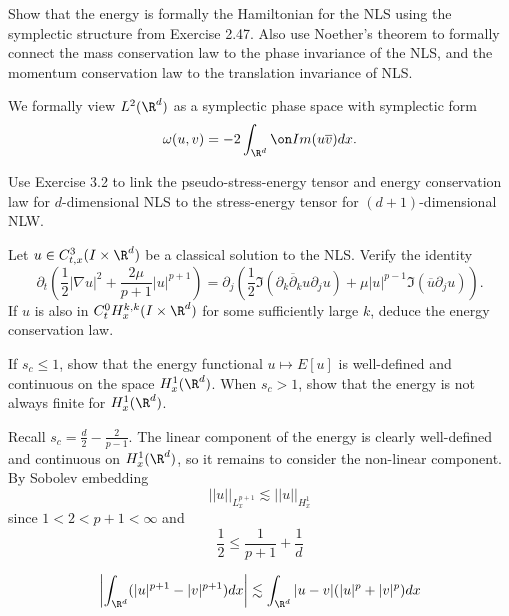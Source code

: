 \begin{statement}
	Show that the energy is formally the Hamiltonian for the NLS using the symplectic structure from Exercise 2.47. Also use Noether's theorem to formally connect the mass conservation law to the phase invariance of the NLS, and the momentum conservation law to the translation invariance of NLS. 
\end{statement}

\begin{solution}
	We formally view $L^2 (\R^d)$ as a symplectic phase space with symplectic form
		\[ \omega (u, v)  = - 2 \int_{\R^d} \Im  (u \overline v) dx. \]
		
\end{solution}

\begin{statement}
	Use Exercise 3.2 to link the pseudo-stress-energy tensor and energy conservation law for $d$-dimensional NLS to the stress-energy tensor for $(d + 1)$-dimensional NLW. 
\end{statement}

\begin{solution}

\end{solution}

\begin{statement}
	Let $u \in C^3_{t, x} (I \times \R^d)$ be a classical solution to the NLS. Verify the identity
		\[ \partial_t \left( \frac12 |\nabla u|^2 + \frac{2\mu}{p + 1} |u|^{p + 1} \right) = \partial_j \left( \frac{1}{2} \Im (\overline{\partial_{k} \partial_k u} \partial_j u) + \mu |u|^{p - 1} \Im (\overline{u} \partial_j u) \right). \]
	If $u$ is also in $C^0_t H^{k, k}_x (I \times \R^d)$ for some sufficiently large $k$, deduce the energy conservation law. 	
\end{statement}

\begin{solution}

\end{solution}

\begin{statement}
	If $s_c \leq 1$, show that the energy functional $u \mapsto E[u]$ is well-defined and continuous on the space $H^1_x (\R^d)$. When $s_c > 1$, show that the energy is not always finite for $H^1_x (\R^d)$. 
\end{statement}

\begin{solution}
	Recall $s_c = \tfrac{d}{2} - \tfrac{2}{p - 1}$. The linear component of the energy is clearly well-defined and continuous on $H^1_x (\R^d)$, so it remains to consider the non-linear component. By Sobolev embedding
		\[ ||u||_{L^{p + 1}_x} \lesssim ||u||_{H^1_x} \]
	since $1 < 2 < p + 1 < \infty$ and
		\[ \frac12 \leq \frac{1}{p + 1} + \frac1d \]	
	
	
		\[ \left|\int_{\R^d} (|u|^{p + 1} - |v|^{p + 1}) dx \right| \lesssim \int_{\R^d} |u - v| (|u|^p + |v|^p) dx \]
	
\end{solution}

